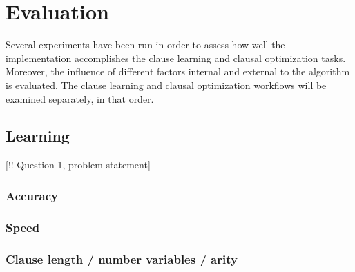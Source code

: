 \chapter{Evaluation}
\label{cha:evaluation}


Several experiments have been run in order to assess how well the implementation accomplishes the clause learning and clausal optimization tasks.
Moreover, the influence of different factors internal and external to the algorithm is evaluated.
The clause learning and clausal optimization workflows will be examined separately, in that order.

\section{Learning}

[!! Question 1, problem statement]

\subsection{Accuracy}

\subsection{Speed}

\subsection{Clause length / number variables / arity}

